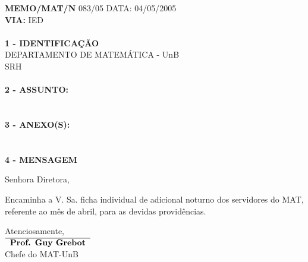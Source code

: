 \documentclass[12pt]{artigo}
\begin{document}
\vspace*{.8cm}
\timbrado
\parindent=2cm 
\setlength{\baselineskip}{5mm}
\noindent 
\begin{minipage}{16cm}
\vspace*{-12mm}
\parindent=2cm
\setlength{\baselineskip}{5mm}
\vspace*{.2cm}
\noindent
\small
{\bf  MEMO/MAT/N\primo} 083/05 \hfill {DATA:} {04/05/2005}
\vum \\
{\bf VIA:} {IED}  
\\
\mbox{} \hrulefill\
\\
{\bf 1 - IDENTIFICA\c{C}\~AO} 
\\
\phantom{xxx}{\bf Proced\^encia:} {DEPARTAMENTO DE MATEM\'ATICA - UnB}
\\
 {SRH}
\\
\mbox{} \hrulefill\
\\
{\bf 2 - ASSUNTO:} \\
\phantom{xxx}{Adicional  Noturno}
\\
\mbox{} \hrulefill\
\\
{\bf 3 - ANEXO(S):} 
\\
\phantom{xxx} {}
\\
\mbox{} \hrulefill\
\\
{ \bf 4 - MENSAGEM} 
\end{minipage}
\setlength{\baselineskip}{9mm}
\vspace*{.92cm} 

Senhora Diretora,
\vspace*{8mm} 

Encaminha a V. Sa. ficha individual de adicional noturno dos servidores do MAT, referente ao m\^es de abril, para as devidas provid\^encias.
\vspace*{15mm} 
\begin{center} 
\setlength{\baselineskip}{6mm}
Atenciosamente,
\vspace*{15mm} \\
$\overline{\phantom{x}\mbox{\bf Prof. Guy Grebot} \phantom{x}}$ 
\\
Chefe do MAT-UnB
\end{center}
\end{document}
